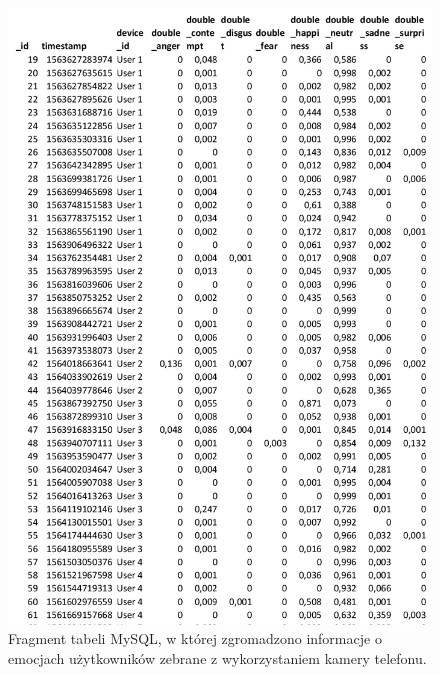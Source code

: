 \begin{figure}[H]
	\centering
	\includegraphics[scale=0.7]{dodatekB/Photo.png}
	\caption{Fragment tabeli MySQL, w której zgromadzono informacje o emocjach użytkowników zebrane z wykorzystaniem kamery telefonu.}
\end{figure}